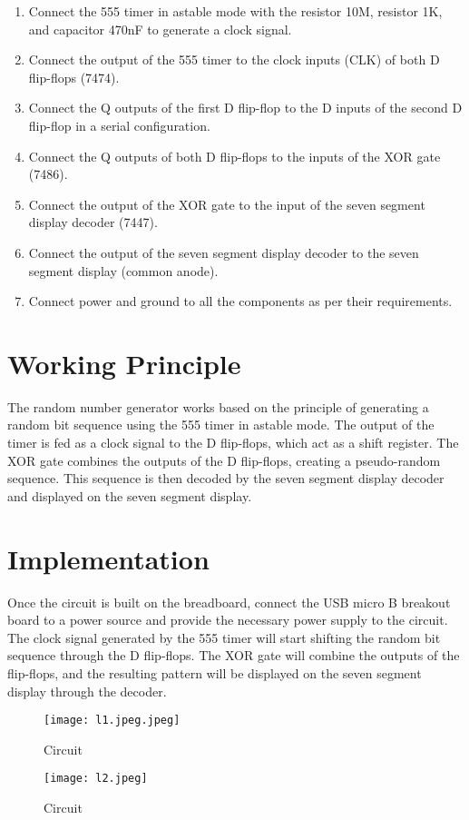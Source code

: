 \documentclass[a4paper,12pt]{article}
\begin{document}
\begin{enumerate}
  \item Connect the 555 timer in astable mode with the resistor 10M, resistor 1K, and capacitor 470nF to generate a clock signal.
  \item Connect the output of the 555 timer to the clock inputs (CLK) of both D flip-flops (7474).
  \item Connect the Q outputs of the first D flip-flop to the D inputs of the second D flip-flop in a serial configuration.
  \item Connect the Q outputs of both D flip-flops to the inputs of the XOR gate (7486).
  \item Connect the output of the XOR gate to the input of the seven segment display decoder (7447).
  \item Connect the output of the seven segment display decoder to the seven segment display (common anode).
  \item Connect power and ground to all the components as per their requirements.
\end{enumerate}

\section{Working Principle}
The random number generator works based on the principle of generating a random bit sequence using the 555 timer in astable mode. The output of the timer is fed as a clock signal to the D flip-flops, which act as a shift register. The XOR gate combines the outputs of the D flip-flops, creating a pseudo-random sequence. This sequence is then decoded by the seven segment display decoder and displayed on the seven segment display.

\section{Implementation}
Once the circuit is built on the breadboard, connect the USB micro B breakout board to a power source and provide the necessary power supply to the circuit. The clock signal generated by the 555 timer will start shifting the random bit sequence through the D flip-flops. The XOR gate will combine the outputs of the flip-flops, and the resulting pattern will be displayed on the seven segment display through the decoder.
\begin{figure}
    \centering
    \texttt{[image: l1.jpeg.jpeg]}
    \caption{Circuit}
    \label{fig:my_label}
\end{figure}
\begin{figure}
    \centering
    \texttt{[image: l2.jpeg]}
    \caption{Circuit}
    \label{fig:my_label}
\end{figure}
\end{document}
